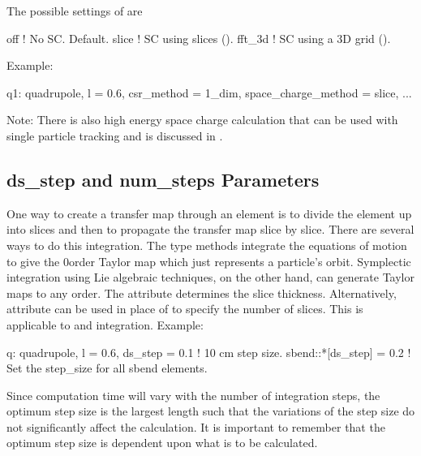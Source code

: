 The possible settings of  are
\begin{example}
  off             ! No SC. Default.
  slice           ! SC using slices ().
  fft_3d          ! SC using a 3D grid ().
\end{example}

Example:
\begin{example}
  q1: quadrupole, l = 0.6, csr_method = 1_dim, space_charge_method = slice, ...
\end{example}

Note: There is also high energy space charge calculation that can be used with single particle
tracking and is discussed in .

\subsection{ds_step and num_steps Parameters}
\label{s:ds.step}

One way to create a transfer map through an element is to divide the element up into slices and then
to propagate the transfer map slice by slice.  There are several ways to do this integration. The
 type methods integrate the equations of motion to give the 0\Th order Taylor map
which just represents a particle's orbit.  Symplectic integration
using Lie algebraic techniques, on the other hand, can generate Taylor maps to any order. The
 attribute determines the slice thickness.  Alternatively,  attribute can
be used in place of  to specify the number of slices.  This is applicable to
 and  integration. Example:
\begin{example}
  q: quadrupole, l = 0.6, ds_step = 0.1  ! 10 cm step size.
  sbend::*[ds_step] = 0.2                ! Set the step_size for all sbend elements.
\end{example}

Since computation time will vary with the number of integration steps, the optimum step size is the
largest length such that the variations of the step size do not significantly affect the
calculation. It is important to remember that the optimum step size is dependent upon what is to be
calculated.

